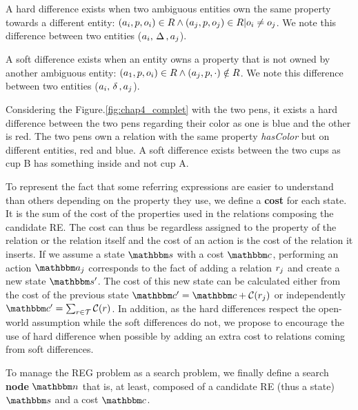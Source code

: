 \begin{definition}
A hard difference exists when two ambiguous entities own the same property towards a different entity: $(a_i, p, o_i) \in R \land (a_j, p, o_j) \in R | o_i \neq o_j$. We note this difference between two entities ($a_i, \,\Delta\,, a_j$).
\end{definition}

\begin{definition}
A soft difference exists when an entity owns a property that is not owned by another ambiguous entity: $(a_1, p, o_i) \in R \land (a_j, p, \cdot) \notin R$. We note this difference between two entities ($a_i, \,\delta\,, a_j$).
\end{definition}

Considering the Figure.\ref{fig:chap4_complet} with the two pens, it exists a hard difference between the two pens regarding their color as one is blue and the other is red. The two pens own a relation with the same property \textit{hasColor} but on different entities, red and blue. A soft difference exists between the two cups as cup B has something inside and not cup A.

To represent the fact that some referring expressions are easier to understand than others depending on the property they use, we define a \textbf{cost} for each state. It is the sum of the cost of the properties used in the relations composing the candidate RE. The cost can thus be regardless assigned to the property of the relation or the relation itself and the cost of an action is the cost of the relation it inserts. If we assume a state $\state$ with a cost $\cost$, performing an action $\action_j$ corresponds to the fact of adding a relation $r_j$ and create a new state $\state'$. The cost of this new state can be calculated either from the cost of the previous state $\cost' = \cost + \costfunc(\relation_j)$ or independently $\cost' = \sum_{\relation \in \mathcal{T}} \costfunc(\relation)$. In addition, as the hard differences respect the open-world assumption while the soft differences do not, we propose to encourage the use of hard difference when possible by adding an extra cost to relations coming from soft differences.

To manage the REG problem as a search problem, we finally define a search \textbf{node} $\node$ that is, at least, composed of a candidate RE (thus a state) $\state$ and a cost $\cost$.

